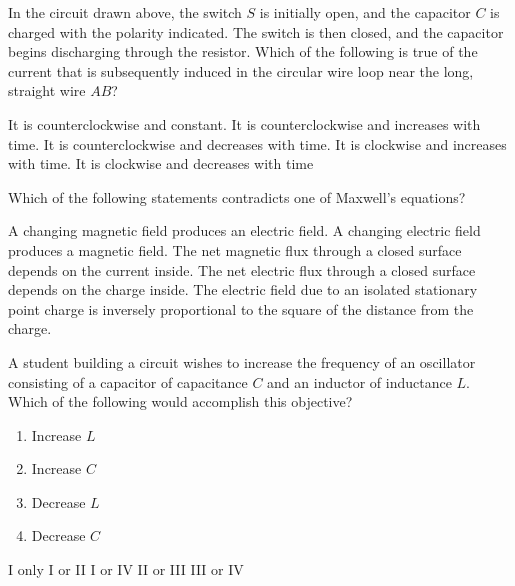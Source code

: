 \documentclass[12pt]{../../../oss-classkick-exam}
\begin{document}
\begin{questions}
  \question In the circuit drawn above, the switch $S$ is initially open, and
  the capacitor $C$ is charged with the polarity indicated. The switch is then
  closed, and the capacitor begins discharging through the resistor. Which of
  the following is true of the current that is subsequently induced in the
  circular wire loop near the long, straight wire $AB$?

  \begin{choices}
    \choice It is counterclockwise and constant.
    \choice It is counterclockwise and increases with time.
    \choice It is counterclockwise and decreases with time.
    \choice It is clockwise and increases with time.
    \choice It is clockwise and decreases with time
  \end{choices}
  \vspace{.3in}
  
  \uplevel{\rule{\linewidth}{.5pt}}
  
  \question Which of the following statements contradicts one of Maxwell's
  equations?
  \begin{choices}
    \choice A changing magnetic field produces an electric field.
    \choice A changing electric field produces a magnetic field.
    \choice The net magnetic flux through a closed surface depends on the
    current inside.
    \choice The net electric flux through a closed surface depends on the
    charge inside.
    \choice The electric field due to an isolated stationary point charge is
    inversely proportional to the square of the distance from the charge.
  \end{choices}
  \vspace{.7in}
  \newpage
  
  
  \question A student building a circuit wishes to increase the frequency of an
  oscillator consisting of a capacitor of capacitance $C$ and an inductor of
  inductance $L$. Which of the following would accomplish this objective?
  \begin{enumerate}[nosep,label={\Roman*.}]
  \item Increase $L$
  \item Increase $C$
  \item Decrease $L$
  \item Decrease $C$
  \end{enumerate}
  \vspace{.2in}
  \begin{choices}
    \choice I only
    \choice I or II
    \choice I or IV
    \choice II or III
    \choice III or IV
  \end{choices}
\end{questions}
\end{document}
